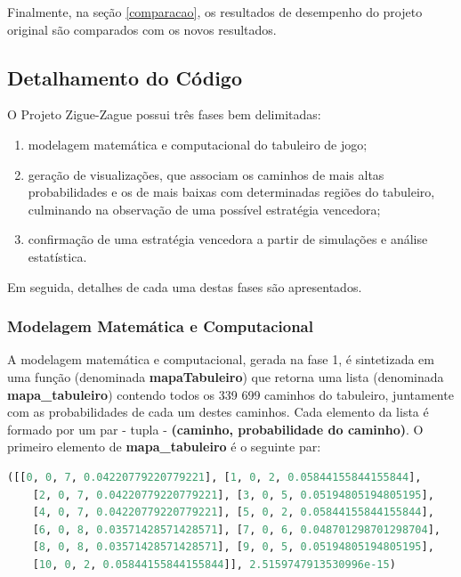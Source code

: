 \documentclass[12pt]{article}
\begin{document}
Finalmente, na seção \ref{comparacao}, os resultados de desempenho do projeto original são comparados com os novos resultados.

\subsection{Detalhamento do Código}
\label{detalhamento}

O Projeto Zigue-Zague possui três fases bem delimitadas: 

\begin{enumerate}
	\item modelagem matemática e computacional do tabuleiro de jogo; 
	\item geração de visualizações, que associam os caminhos de mais altas probabilidades e os de mais baixas com determinadas regiões do tabuleiro, culminando na observação de uma possível estratégia vencedora; 
	\item confirmação de uma estratégia vencedora a partir de simulações e análise estatística.
\end{enumerate} 

Em seguida, detalhes de cada uma destas fases são apresentados.

\subsubsection{Modelagem Matemática e Computacional}
\label{modelagem}

A modelagem matemática e computacional, gerada na fase 1, é sintetizada em uma função (denominada \textbf{mapaTabuleiro}) que retorna uma lista (denominada \textbf{mapa\_tabuleiro}) contendo todos os 339 699 caminhos do tabuleiro, juntamente com as probabilidades de cada um destes caminhos. Cada elemento da lista é formado por um par - tupla - \textbf{(caminho, probabilidade do caminho)}. O primeiro elemento de \textbf{mapa\_tabuleiro} é o seguinte par:

\begin{lstlisting}[language=Python]
([[0, 0, 7, 0.04220779220779221], [1, 0, 2, 0.05844155844155844], 
	[2, 0, 7, 0.04220779220779221], [3, 0, 5, 0.05194805194805195],
	[4, 0, 7, 0.04220779220779221], [5, 0, 2, 0.05844155844155844], 
	[6, 0, 8, 0.03571428571428571], [7, 0, 6, 0.048701298701298704], 
	[8, 0, 8, 0.03571428571428571], [9, 0, 5, 0.05194805194805195], 
	[10, 0, 2, 0.05844155844155844]], 2.5159747913530996e-15)
\end{lstlisting}
\end{document}
